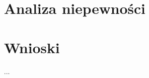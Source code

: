 \documentclass[a4paper,10pt]{article}
\begin{document}
\section{Analiza niepewności}

\section{Wnioski}
\paragraph{}...
\end{document}
